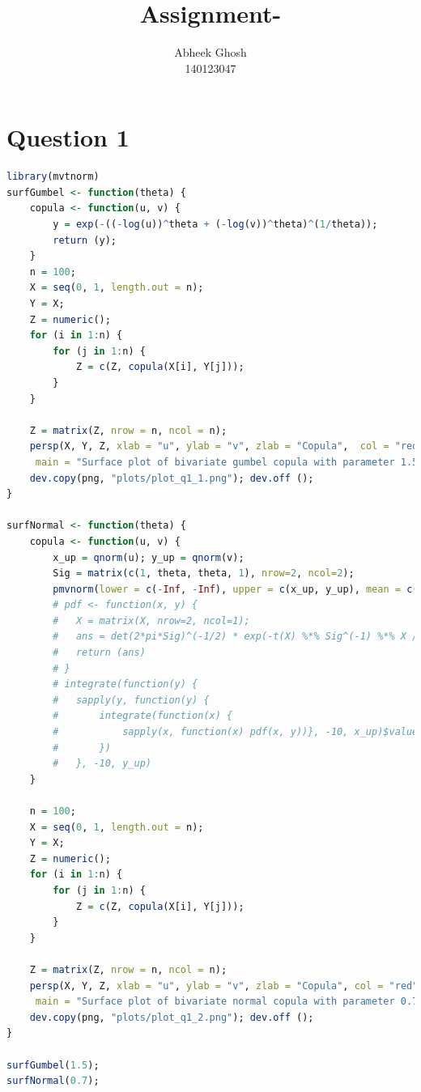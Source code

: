 \documentclass{article}
\begin{document}
	\title{\textbf{Assignment-}}
	\author{Abheek Ghosh \\ 
		140123047 }
	
	\maketitle
	

\section{Question 1}


\begin{lstlisting}[language=R]
library(mvtnorm)
surfGumbel <- function(theta) {
	copula <- function(u, v) {
		y = exp(-((-log(u))^theta + (-log(v))^theta)^(1/theta));
		return (y);
	}
	n = 100;
	X = seq(0, 1, length.out = n);
	Y = X;
	Z = numeric();
	for (i in 1:n) {
		for (j in 1:n) {
			Z = c(Z, copula(X[i], Y[j]));
		}
	}

	Z = matrix(Z, nrow = n, ncol = n);
	persp(X, Y, Z, xlab = "u", ylab = "v", zlab = "Copula",  col = "red",
	 main = "Surface plot of bivariate gumbel copula with parameter 1.5");
	dev.copy(png, "plots/plot_q1_1.png"); dev.off ();
}

surfNormal <- function(theta) {
	copula <- function(u, v) {
		x_up = qnorm(u); y_up = qnorm(v);
		Sig = matrix(c(1, theta, theta, 1), nrow=2, ncol=2);
		pmvnorm(lower = c(-Inf, -Inf), upper = c(x_up, y_up), mean = c(0, 0), corr = Sig);
		# pdf <- function(x, y) {			
		# 	X = matrix(X, nrow=2, ncol=1);
		# 	ans = det(2*pi*Sig)^(-1/2) * exp(-t(X) %*% Sig^(-1) %*% X / 2);
		# 	return (ans)
		# }
		# integrate(function(y) {
		# 	sapply(y, function(y) {
		# 		integrate(function(x) {
		# 			sapply(x, function(x) pdf(x, y))}, -10, x_up)$value
		# 		})
		# 	}, -10, y_up)
	}

	n = 100;
	X = seq(0, 1, length.out = n);
	Y = X;
	Z = numeric();
	for (i in 1:n) {
		for (j in 1:n) {
			Z = c(Z, copula(X[i], Y[j]));
		}
	}

	Z = matrix(Z, nrow = n, ncol = n);
	persp(X, Y, Z, xlab = "u", ylab = "v", zlab = "Copula", col = "red",
	 main = "Surface plot of bivariate normal copula with parameter 0.7");
	dev.copy(png, "plots/plot_q1_2.png"); dev.off ();
}

surfGumbel(1.5);
surfNormal(0.7);
\end{lstlisting}
\end{document}
